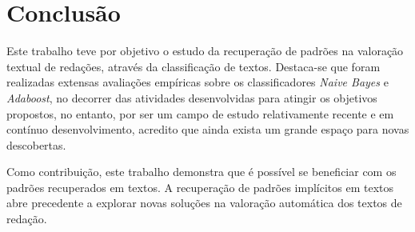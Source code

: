 \section{Conclusão}

Este trabalho teve por objetivo o estudo da recuperação de padrões na valoração 
textual de redações, através da classificação de textos. Destaca-se que foram 
realizadas extensas avaliações empíricas sobre os classificadores 
\textit{Naive Bayes} e \textit{Adaboost}, no decorrer das atividades 
desenvolvidas para atingir os objetivos propostos, no entanto, por ser um campo 
de estudo relativamente recente e em contínuo desenvolvimento, acredito que 
ainda exista um grande espaço para novas descobertas.

Como contribuição, este trabalho demonstra que é possível se beneficiar com os 
padrões recuperados em textos. A recuperação de padrões implícitos em textos 
abre precedente a explorar novas soluções na valoração automática dos textos 
de redação.